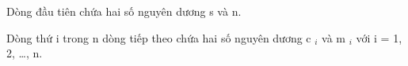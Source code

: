 Dòng đầu tiên chứa hai số nguyên dương s và n.

Dòng thứ i trong n dòng tiếp theo chứa hai số nguyên dương c $_ i $ và m $_ i $ với i = 1, 2, …, n.

\